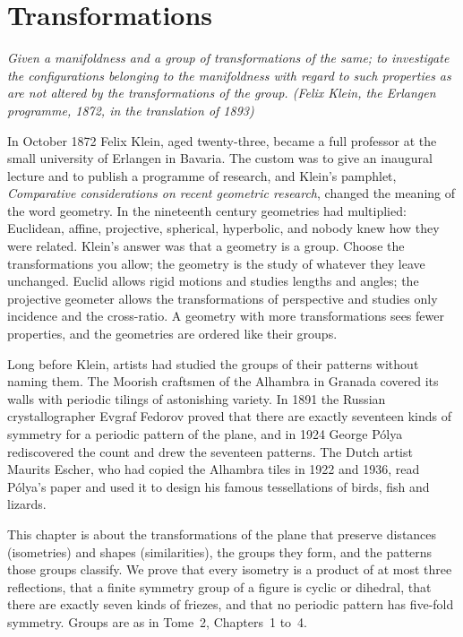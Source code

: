 \chapter{Transformations}\label{ch:transformations}

\begin{center}\itshape
Given a manifoldness and a group of transformations of the same; to investigate the configurations belonging to the
manifoldness with regard to such properties as are not altered by the transformations of the group.
\upshape(Felix Klein, the Erlangen programme, 1872, in the translation of 1893)
\end{center}

In October 1872 Felix Klein, aged twenty-three, became a full professor at the small university of Erlangen in Bavaria. The custom
was to give an inaugural lecture and to publish a programme of research, and Klein's pamphlet, \emph{Comparative considerations on recent
geometric research}, changed the meaning of the word geometry. In the nineteenth century geometries had multiplied: Euclidean,
affine, projective, spherical, hyperbolic, and nobody knew how they were related. Klein's answer was that a geometry is a group. Choose
the transformations you allow; the geometry is the study of whatever they leave unchanged. Euclid allows rigid motions and studies
lengths and angles; the projective geometer allows the transformations of perspective and studies only incidence and the cross-ratio.
A geometry with more transformations sees fewer properties, and the geometries are ordered like their groups.

Long before Klein, artists had studied the groups of their patterns without naming them. The Moorish craftsmen of the Alhambra in
Granada covered its walls with periodic tilings of astonishing variety. In 1891 the Russian crystallographer Evgraf Fedorov proved that
there are exactly seventeen kinds of symmetry for a periodic pattern of the plane, and in 1924 George P\'olya rediscovered the count
and drew the seventeen patterns. The Dutch artist Maurits Escher, who had copied the Alhambra tiles in 1922 and 1936, read P\'olya's
paper and used it to design his famous tessellations of birds, fish and lizards.

This chapter is about the transformations of the plane that preserve distances (isometries) and shapes (similarities), the groups
they form, and the patterns those groups classify. We prove that every isometry is a product of at most three reflections, that a
finite symmetry group of a figure is cyclic or dihedral, that there are exactly seven kinds of friezes, and that no periodic pattern
has five-fold symmetry. Groups are as in Tome~2, Chapters~1 to~4.

